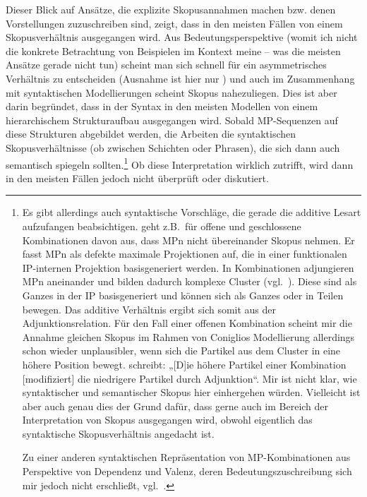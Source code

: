 \noindent
Dieser Blick auf Ansätze, die explizite Skopusannahmen machen bzw. denen Vorstellungen zuzuschreiben sind, zeigt, dass in den meisten Fällen von einem Skopusverhältnis ausgegangen wird. Aus Bedeutungsperspektive (womit ich nicht die konkrete Betrachtung von Beispielen im Kontext meine – was die meisten Ansätze gerade nicht tun) scheint man sich schnell für ein asymmetrisches Verhältnis zu entscheiden (Ausnahme ist hier nur \citealt{Thurmair1989}) und auch im Zusammenhang mit syntaktischen Modellierungen scheint Skopus nahezuliegen. Dies ist aber darin begründet, dass in der Syntax in den meisten Modellen von einem hie\-rarchischem Strukturaufbau ausgegangen wird. Sobald MP-Sequenzen auf diese Strukturen abgebildet werden,  die Arbeiten die syntaktischen Skopusverhältnisse (ob zwischen Schichten oder Phrasen), die sich dann auch semantisch spiegeln sollten.\footnote{Es gibt allerdings auch syntaktische Vorschläge, die gerade die additive Lesart aufzufangen beabsichtigen. \citet[98]{Coniglio2011} geht z.B.\ für offene und geschlossene Kombinationen davon aus, dass MPn nicht übereinander Skopus nehmen. Er fasst MPn als defekte maximale Projektionen auf, die in einer funktionalen IP-internen Projektion basisgeneriert werden. In Kombinationen adjungieren MPn aneinander und bilden dadurch komplexe Cluster (vgl.\ \citeyear[119]{Coniglio2011}). Diese sind als Ganzes in der IP basisgeneriert und können sich als Ganzes oder in Teilen bewegen. Das additive Verhältnis ergibt sich somit aus der Adjunktions\-relation. Für den Fall einer offenen Kombination scheint mir die Annahme gleichen Skopus im Rahmen von Coniglios Modellierung allerdings schon wieder unplausibler, wenn sich die Partikel aus dem Cluster in eine höhere Position bewegt. \citet[121]{Coniglio2011} schreibt: „[D]ie höhere Partikel einer Kombination [modifiziert] die niedrigere Partikel durch Adjunktion“. Mir ist nicht klar, wie syntaktischer und semantischer Skopus hier einhergehen würden. Vielleicht ist aber auch genau dies der Grund dafür, dass gerne auch im Bereich der Interpretation von Skopus ausgegangen wird, obwohl eigentlich das syntaktische Skopusverhältnis angedacht ist.

Zu einer anderen syntaktischen Repräsentation von MP-Kom\-bi\-na\-ti\-on\-en aus Perspektive von Dependenz und Valenz, deren Bedeutungszuschreibung sich mir jedoch nicht erschließt, vgl.\ \citet[1021]{Eroms2006}.} 
Ob diese Interpretation wirklich zutrifft, wird dann in den meisten Fällen jedoch nicht überprüft oder diskutiert.\\


